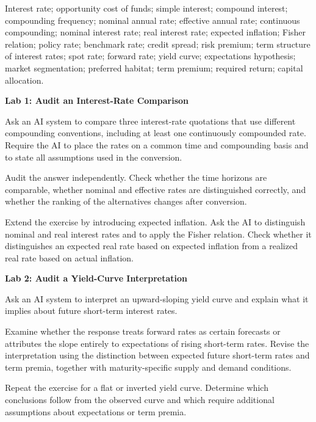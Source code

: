 
Interest rate; opportunity cost of funds; simple interest; compound interest; compounding frequency; nominal annual rate; effective annual rate; continuous compounding; nominal interest rate; real interest rate; expected inflation; Fisher relation; policy rate; benchmark rate; credit spread; risk premium; term structure of interest rates; spot rate; forward rate; yield curve; expectations hypothesis; market segmentation; preferred habitat; term premium; required return; capital allocation.



\textbf{Lab 1: Audit an Interest-Rate Comparison}

Ask an AI system to compare three interest-rate quotations that use different compounding conventions, including at least one continuously compounded rate. Require the AI to place the rates on a common time and compounding basis and to state all assumptions used in the conversion.

Audit the answer independently. Check whether the time horizons are comparable, whether nominal and effective rates are distinguished correctly, and whether the ranking of the alternatives changes after conversion.

Extend the exercise by introducing expected inflation. Ask the AI to distinguish nominal and real interest rates and to apply the Fisher relation. Check whether it distinguishes an expected real rate based on expected inflation from a realized real rate based on actual inflation.

\textbf{Lab 2: Audit a Yield-Curve Interpretation}

Ask an AI system to interpret an upward-sloping yield curve and explain what it implies about future short-term interest rates.

Examine whether the response treats forward rates as certain forecasts or attributes the slope entirely to expectations of rising short-term rates. Revise the interpretation using the distinction between expected future short-term rates and term premia, together with maturity-specific supply and demand conditions.

Repeat the exercise for a flat or inverted yield curve. Determine which conclusions follow from the observed curve and which require additional assumptions about expectations or term premia.

